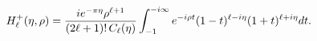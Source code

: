 \[\mathop{{H^{+}_{\ell}}\/}\nolimits\!\left(\eta,\rho\right)=\frac{ie^{-\pi\eta}%
\rho^{\ell+1}}{(2\ell+1)!\mathop{C_{\ell}\/}\nolimits\!\left(\eta\right)}\int_%
{-1}^{-i\infty}e^{-i\rho t}(1-t)^{\ell-i\eta}(1+t)^{\ell+i\eta}dt.\]